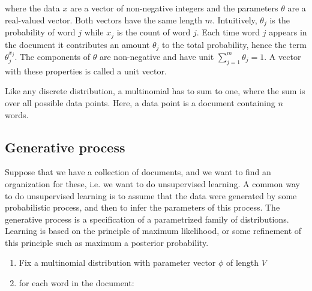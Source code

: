 \documentclass[12pt]{report}
\begin{document}
where the data $x$ are a vector of non-negative integers and the parameters $\theta$ are a real-valued vector. Both vectors have the same length $m$. Intuitively, $\theta_j$ is the probability of word $j$ while $x_j$ is the count of word $j$. Each time word $j$ appears in the document it contributes an amount $\theta_j$ to the total probability, hence the term $\theta_j^{x_j}$. The components of $\theta$ are non-negative and have unit $\sum\limits_{j=1}^m \theta_j = 1$. A vector with these properties is called a unit vector.\par

\vspace{3mm}

Like any discrete distribution, a multinomial has to sum to one, where the sum is over all possible data points. Here, a data point is a document containing $n$ words.

\vspace{10mm}


\subsection{Generative process}

\vspace{5mm}

Suppose that we have a collection of documents, and we want to find an organization for these, i.e. we want to do unsupervised learning. A common way to do unsupervised learning is to assume that the data were generated by some probabilistic process, and then to infer the parameters of this process. The generative process is a specification of a parametrized family of distributions. Learning is based on the principle of maximum likelihood, or some refinement of this principle such as maximum a posterior probability.\par

\vspace{3mm}

\begin{enumerate}
  \item Fix a multinomial distribution with parameter vector $\phi$ of length $V$
  \item for each word in the document:
\end{enumerate}
\end{document}
